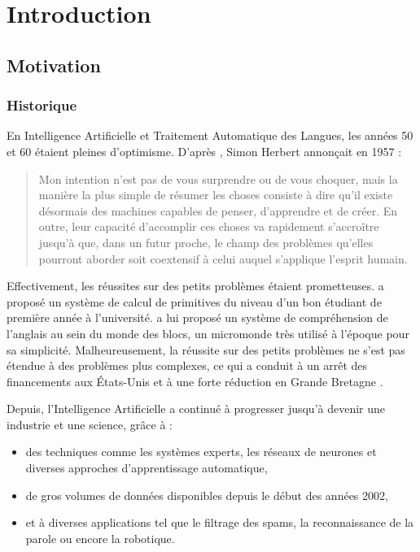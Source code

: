 \chapter{Introduction}
\label{ch:intro}

\section{Motivation}

\subsection{Historique}

En Intelligence Artificielle et Traitement Automatique des Langues, les années
50 et 60 étaient pleines d'optimisme. D'après \citep{russell2010artificial},
Simon Herbert annonçait en 1957 :

\begin{quote}
    Mon intention n'est pas de vous surprendre ou de vous choquer, mais la
    manière la plus simple de résumer les choses consiste à dire qu'il existe
    désormais des machines capables de penser, d'apprendre et de créer. En
    outre, leur capacité d'accomplir ces choses va rapidement s'accroître
    jusqu'à que, dans un futur proche, le champ des problèmes qu'elles pourront
    aborder soit coextensif à celui auquel s'applique l'esprit humain.
\end{quote}

Effectivement, les réussites sur des petits problèmes étaient prometteuses.
\cite{slagle1963heuristic} a proposé un système de calcul de primitives du
niveau d'un bon étudiant de première année à l'université.
\cite{winograd1972understanding} a lui proposé un système de compréhension de
l'anglais au sein du monde des blocs, un micromonde très utilisé à l'époque
pour sa simplicité. Malheureusement, la réussite sur des petits problèmes ne
s'est pas étendue à des problèmes plus complexes, ce qui a conduit à un arrêt
des financements aux États-Unis \citep{pierce1966alpac} et à une forte
réduction en Grande Bretagne \citep{lighthill1973artificial}.

Depuis, l'Intelligence Artificielle a continué à progresser jusqu'à devenir une
industrie et une science, grâce à :
\begin{itemize}
    \item des techniques comme les systèmes experts, les réseaux de neurones et
        diverses approches d'apprentissage automatique,
    \item de gros volumes de données disponibles depuis le début des années
        2002,
    \item et à diverses applications tel que le filtrage des spams, la
        reconnaissance de la parole ou encore la robotique.
\end{itemize}

